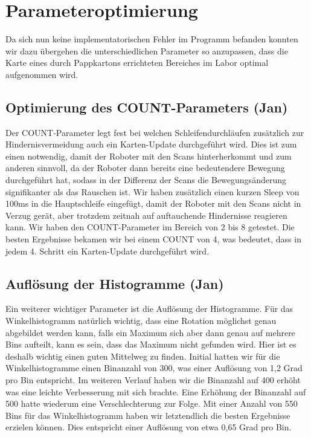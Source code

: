 \section{Parameteroptimierung}

Da sich nun keine implementatorischen Fehler im Programm befanden konnten wir dazu übergehen die unterschiedlichen Parameter so anzupassen, dass die Karte eines durch Pappkartons errichteten Bereiches im Labor optimal aufgenommen wird.

\subsection{Optimierung des COUNT-Parameters (Jan)}

Der COUNT-Parameter legt fest bei welchen Schleifendurchläufen zusätzlich zur Hindernisvermeidung auch ein Karten-Update durchgeführt wird. Dies ist zum einen notwendig, damit der Roboter mit den Scans hinterherkommt und zum anderen sinnvoll, da der Roboter dann bereits eine bedeutendere Bewegung durchgeführt hat, sodass in der Differenz der Scans die Bewegungsänderung signifikanter als das Rauschen ist. Wir haben zusätzlich einen kurzen Sleep von 100ms in die Hauptschleife eingefügt, damit der Roboter mit den Scans nicht in Verzug gerät, aber trotzdem zeitnah auf auftauchende Hindernisse reagieren kann.
Wir haben den COUNT-Parameter im Bereich von 2 bis 8 getestet. Die besten Ergebnisse bekamen wir bei einem COUNT von 4, was bedeutet, dass in jedem 4. Schritt ein Karten-Update durchgeführt wird.




\subsection{Auflösung der Histogramme (Jan)}

Ein weiterer wichtiger Parameter ist die Auflösung der Histogramme.
Für das Winkelhistogramm natürlich wichtig, dass eine Rotation möglichst genau abgebildet werden kann, falls ein Maximum sich aber dann genau auf mehrere Bins aufteilt, kann es sein, dass das Maximum nicht gefunden wird. Hier ist es deshalb wichtig einen guten Mittelweg zu finden. Initial hatten wir für die Winkelhistogramme einen Binanzahl von 300, was einer Auflösung von 1,2 Grad pro Bin entspricht. Im weiteren Verlauf haben wir die Binanzahl auf 400 erhöht was eine leichte Verbesserung mit sich brachte. Eine Erhöhung der Binanzahl auf 500 hatte wiederum eine Verschlechterung zur Folge. Mit einer Anzahl von 550 Bins für das Winkelhistogramm haben wir letztendlich die besten Ergebnisse erzielen können. Dies entspricht einer Auflösung von etwa 0,65 Grad pro Bin.

